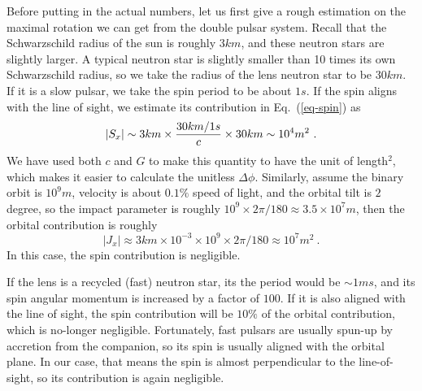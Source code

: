 \documentclass[aps,showpacs,twocolumn,floats,prd,superscriptaddress,nofootinbib]{revtex4}
\begin{document}
Before putting in the actual numbers, let us first give a rough estimation on the maximal rotation we can get from the double pulsar system.
Recall that the Schwarzschild radius of the sun is roughly $3km$, and these neutron stars are slightly larger.
A typical neutron star is slightly smaller than 10 times its own Schwarzschild radius, so we take the radius of the lens neutron star to be $30km$.
If it is a slow pulsar, we take the spin period to be about $1s$.
If the spin aligns with the line of sight, we estimate its contribution in Eq.~(\ref{eq-spin}) as
\begin{equation}
|S_x|  \sim  3km \times \frac{30km/1s}{c} \times 30km \sim 10^4 m^2~. \nonumber \\
{\color{red}   
}
\end{equation}
We have used both $c$ and $G$ to make this quantity to have the unit of length$^2$, which makes it easier to calculate the unitless $\Delta\phi$.
Similarly, assume the binary orbit is $10^9 m$, velocity is about $0.1\%$ speed of light, and the orbital tilt is $2$ degree, so the impact parameter is roughly $10^9 \times 2\pi/180 \approx 3.5 \times 10^7 m$, then the orbital contribution is roughly
\begin{equation}
|J_x| \approx  3km \times 10^{-3} \times 10^9 \times 2\pi/180  \approx 10^7 m^2~.
\end{equation}
In this case, the spin contribution is negligible.

If the lens is a recycled (fast) neutron star, its the period would be $\sim 1ms$, and its spin angular momentum is increased by a factor of $100$.
If it is also aligned with the line of sight, the spin contribution will be $10\%$ of the orbital contribution, which is no-longer negligible.
Fortunately, fast pulsars are usually spun-up by accretion from the companion, so its spin is usually aligned with the orbital plane.
In our case, that means the spin is almost perpendicular to the line-of-sight, so its contribution is again negligible.
\end{document}
